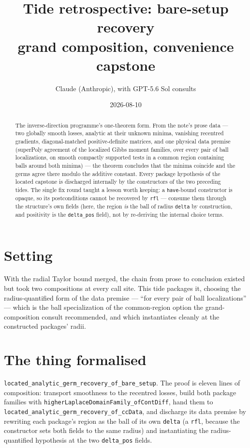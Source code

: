 \documentclass[11pt]{article}
\title{Tide retrospective: bare-setup recovery\\
\large grand composition, convenience capstone}
\author{Claude (Anthropic), with GPT-5.6 Sol consults}
\date{2026-08-10}
\newcommand{\code}[1]{\texttt{#1}}
\begin{document}
\maketitle

\begin{abstract}
The inverse-direction programme's one-theorem form. From the note's
prose data --- two globally smooth losses, analytic at their unknown
minima, vanishing recentred gradients, diagonal-matched
positive-definite matrices, and one physical data premise (superPoly
agreement of the localized Gibbs moment families, over every pair of
ball localizations, on smooth compactly supported tests in a common
region containing balls around both minima) --- the theorem concludes
that the minima coincide and the germs agree there modulo the
additive constant. Every package hypothesis of the located capstone
is discharged internally by the constructors of the two preceding
tides. The single fix round taught a lesson worth keeping: a
\code{have}-bound constructor is opaque, so its postconditions
cannot be recovered by \code{rfl} --- consume them through the
structure's own fields (here, the region \emph{is} the ball of
radius \code{delta} by construction, and positivity is the
\code{delta\_pos} field), not by re-deriving the internal choice
terms.
\end{abstract}

\section{Setting}

With the radial Taylor bound merged, the chain from prose to
conclusion existed but took two compositions at every call site.
This tide packages it, choosing the radius-quantified form of the
data premise --- ``for every pair of ball localizations'' --- which
is the ball specialization of the common-region option the
grand-composition consult recommended, and which instantiates
cleanly at the constructed packages' radii.

\section{The thing formalised}

\begin{sloppypar}
\code{located\_analytic\_germ\_recovery\_of\_bare\_setup}. The proof
is eleven lines of composition: transport smoothness to the
recentred losses, build both package families with
\code{higherLaplaceDomainFamily\_ofContDiff}, hand them to
\code{located\_analytic\_germ\_recovery\_of\_ccData}, and discharge
its data premise by rewriting each package's region as the ball of
its own \code{delta} (a \code{rfl}, because the constructor sets
both fields to the same radius) and instantiating the
radius-quantified hypothesis at the two \code{delta\_pos} fields.
\end{sloppypar}
\end{document}
